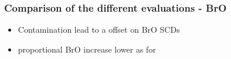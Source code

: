 \documentclass{beamer} %
\begin{document}
		\begin{frame}
			\frametitle{\color{mygreen}Comparison of the different evaluations - BrO\\%
				\color{mygreen}{\rule{0.8\textwidth}{2pt}}}
			\begin{figure}[h!]	
			\end{figure}
			\pause
			\begin{multicols}{2}
				\begin{itemize}
					\item  Contamination lead to a offset on BrO SCDs\\ 
					\pause
					\item proportional BrO increase lower as for 
				\end{itemize}
			\end{multicols}
		\end{frame}
		
\end{document}
